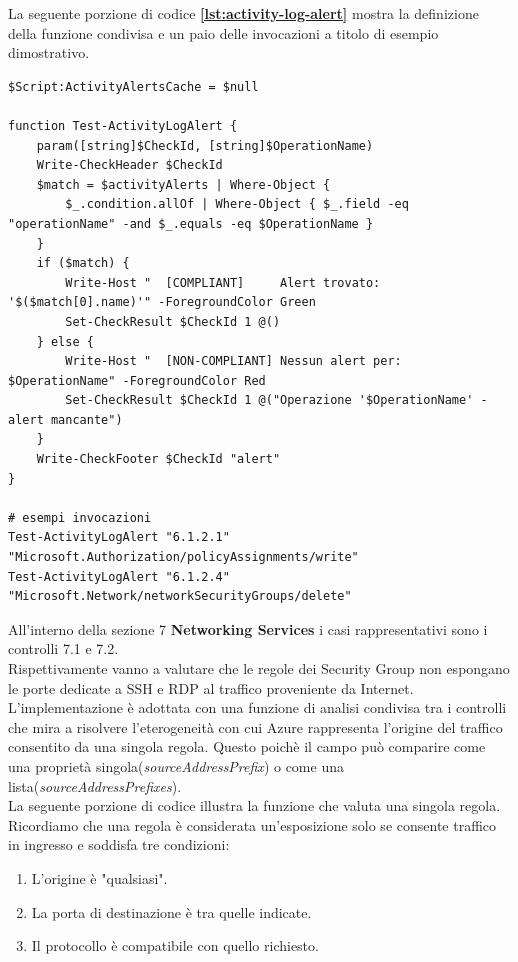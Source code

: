\documentclass[a4paper,11pt]{report}
\begin{document}
La seguente porzione di codice \textbf{\ref{lst:activity-log-alert}} mostra la definizione della funzione condivisa e un paio delle invocazioni a titolo di esempio dimostrativo. \\


\begin{lstlisting}[style=azcli, caption={Funzione condivisa dedicata \texttt{Test-ActivityLogAlert}}, label={lst:activity-log-alert}]
$Script:ActivityAlertsCache = $null

function Test-ActivityLogAlert {
    param([string]$CheckId, [string]$OperationName)
    Write-CheckHeader $CheckId 
    $match = $activityAlerts | Where-Object {
        $_.condition.allOf | Where-Object { $_.field -eq "operationName" -and $_.equals -eq $OperationName }
    }
    if ($match) {
        Write-Host "  [COMPLIANT]     Alert trovato: '$($match[0].name)'" -ForegroundColor Green
        Set-CheckResult $CheckId 1 @()
    } else {
        Write-Host "  [NON-COMPLIANT] Nessun alert per: $OperationName" -ForegroundColor Red
        Set-CheckResult $CheckId 1 @("Operazione '$OperationName' - alert mancante")
    }
    Write-CheckFooter $CheckId "alert"
}

# esempi invocazioni
Test-ActivityLogAlert "6.1.2.1" "Microsoft.Authorization/policyAssignments/write"
Test-ActivityLogAlert "6.1.2.4" "Microsoft.Network/networkSecurityGroups/delete"
\end{lstlisting}


All'interno della sezione 7 \textbf{Networking Services} i casi rappresentativi sono i controlli 7.1 e 7.2. \\
Rispettivamente vanno a valutare che le regole dei Security Group non espongano le porte dedicate a SSH e RDP al traffico proveniente da Internet. \\
L'implementazione è adottata con una funzione di analisi condivisa tra i controlli che mira a risolvere l'eterogeneità con cui Azure rappresenta l'origine del traffico consentito da una singola regola. Questo poichè il campo può comparire come una proprietà singola(\textit{sourceAddressPrefix}) o come una lista(\textit{sourceAddressPrefixes}).\\
La seguente porzione di codice illustra la funzione che valuta una singola regola. Ricordiamo che una regola è considerata un'esposizione solo se consente traffico in ingresso e soddisfa tre condizioni:
\begin{enumerate}
\item L'origine è "qualsiasi".
\item La porta di destinazione è tra quelle indicate.
\item Il protocollo è compatibile con quello richiesto.
\end{enumerate}
\end{document}
